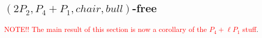 \documentclass[11pt]{article}
\newtheorem{lemma}[theorem]{Lemma}
\theoremstyle{definition}
\newcommand{\noneighbs}{\overline{N[v]}}
\begin{document}
%
%

\subsection{$(2P_2, P_4 + P_1, chair, bull)$-free}
\textcolor{red}{NOTE!! The main result of this section is now a corollary of the $P_4+\ell P_1$ stuff}.
\end{document}

